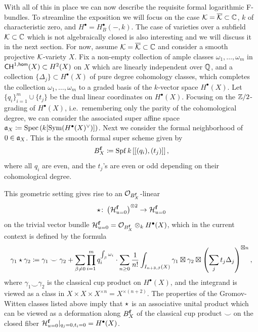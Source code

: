 \documentclass[twoside,leqno]{article}
\numberwithin{equation}{section}
\theoremstyle{plain}
\theoremstyle{definition}
\begin{document}
With all of this in place we can now describe the requisite formal logarithmic F-bundles.  To streamline the exposition we will focus on the case $\mathcal K = \overline{\mathcal K} \subset \mathbb C$, $k$ of characteristic zero, and $H^{\bullet} = H^{\bullet}_{B}(-,k)$. The case of varieties over a subfield $\mathcal K \subset \mathbb C$ which is not algebraically closed is also interesting and we will discuss it in the next section.  For now, assume $\mathcal K = \overline{\mathcal K} \subset \mathbb C$ and consider a smooth projective $\mathcal K$-variety $X$. Fix a non-empty collection  of ample classes $\omega_{1}, \ldots, \omega_{m}$ in $\mathsf{CH}^{1,\mathsf{hom}}(X) \subset H^2(X)$ on $X$ which are linearly independent over $\mathbb Q$, and a collection 
$\{\Delta_{j}\} \subset H^{\bullet}(X)$ of pure degree cohomology classes, which completes 
the collection $\omega_{1}, \ldots, \omega_{m}$ to a graded basis of the $k$-vector space $H^{\bullet}(X)$.  Let $\{q_{i}\}_{i = 1}^{m}\cup \{t_{j}\}$ be the dual linear coordinates on $H^{\bullet}(X)$. Focusing on the $\mathbb Z/2$-grading of $H^{\bullet}(X)$, i.e.\ remembering only the parity of the cohomological degree,  we can consider 
the associated super affine space ${\mathfrak{a}}_{X}  \coloneqq \operatorname{Spec} \left(k[ \operatorname{Sym}(H^{\bullet}(X)^{\vee}\right)])$. Next we consider  the formal neighborhood of $0 \in {\mathfrak{a}}_{X}$. This is the smooth formal super scheme given by
\[
B_{X}^{\mathbf{f}} \coloneqq \operatorname{Spf} k\left[\left[ (q_{i}), (t_{j})\right]\right],
\]
where all $q_{i}$ are even, and the $t_{j}$'s are even or odd depending on their cohomological degree.  
\medskip

This geometric setting gives rise to an 
$\mathcal{O}_{B_{X}^{\mathbf{f}}}$-linear  
\[
\star \colon \left(\mathcal H^{\mathbf{f}}_{u=0}\right)^{\otimes 2} \to \mathcal H^{\mathbf{f}}_{u=0}
\]
on the trivial vector bundle 
 $\mathcal H^{\mathbf{f}}_{u=0} = \mathcal{O}_{B_{X}^{\mathbf{f}}}\otimes_{k} H^{\bullet}(X)$, which in the current context is defined by
the formula
\begin{equation} \label{eq:*omegas}
\gamma_{1}\star \gamma_{2} \coloneqq \gamma_{1}\smile \gamma_{2} + \sum_{\substack{\beta \neq 0}} \prod_{i=1}^{m} q_{i}^{\int_{\beta} \omega_{i}} \cdot \sum_{\substack{n \geq 0}} \frac{1}{n!} \int_{I_{n+3,\beta}(X)} \gamma_{1}\boxtimes \gamma_{2} \boxtimes 
\left( \sum_{j}\displaylimits  t_{j}\Delta_{j} \right)^{\boxtimes n},
\end{equation}
where $\gamma_{1}\smile \gamma_{2}$ is the classical cup product on $H^{\bullet}(X)$, and the integrand is viewed as a class in $X\times X \times X^{\times n} = X^{\times (n+2)}$. 
The properties of the Gromov-Witten classes listed above imply that 
$\star$ is an associative unital product which can be viewed  as a deformation along $B_{X}^{\mathbf{f}}$ of the classical cup product $\smile$  on the closed fiber $\mathcal H^{\mathbf{f}}_{u=0}|_{q_{j}=0,t_{i}=0} = H^{\bullet}(X)$. 
\end{document}
